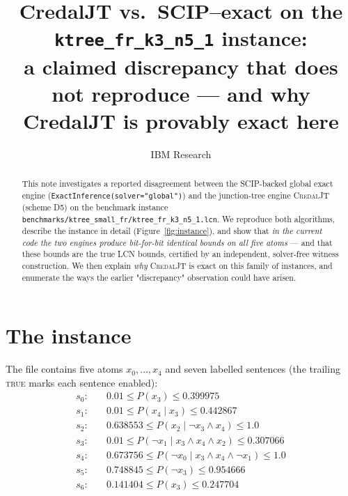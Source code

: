 \documentclass[11pt]{article}
\title{CredalJT vs.\ SCIP--exact on the \texttt{ktree\_fr\_k3\_n5\_1} instance:\\
\large a claimed discrepancy that does not reproduce --- and why CredalJT is
provably exact here}
\author{IBM Research}
\date{}
\newcommand{\ltrue}{\textsc{true}}
\begin{document}
\maketitle

\begin{abstract}
This note investigates a reported disagreement between the SCIP-backed global
exact engine (\texttt{ExactInference(solver="global")}) and the junction-tree
engine \textsc{CredalJT} (scheme D5) on the benchmark instance
\texttt{benchmarks/ktree\_small\_fr/ktree\_fr\_k3\_n5\_1.lcn}. We reproduce
both algorithms, describe the instance in detail (Figure~\ref{fig:instance}),
and show that \emph{in the current code the two engines produce bit-for-bit
identical bounds on all five atoms} --- and that these bounds are the true LCN
bounds, certified by an independent, solver-free witness construction. We then
explain \emph{why} \textsc{CredalJT} is exact on this family of instances, and
enumerate the ways the earlier "discrepancy" observation could have arisen.
\end{abstract}

\section{The instance}
\label{sec:instance}

The file contains five atoms $x_0,\dots,x_4$ and seven labelled sentences
(the trailing \ltrue{} marks each sentence enabled):
\begin{align*}
s_0:&\quad 0.01 \le P(x_3) \le 0.399975\\
s_1:&\quad 0.01 \le P(x_4 \mid x_3) \le 0.442867\\
s_2:&\quad 0.638553 \le P(x_2 \mid \lnot x_3 \land x_4) \le 1.0\\
s_3:&\quad 0.01 \le P(\lnot x_1 \mid x_3 \land x_4 \land x_2) \le 0.307066\\
s_4:&\quad 0.673756 \le P(\lnot x_0 \mid x_3 \land x_4 \land \lnot x_1) \le 1.0\\
s_5:&\quad 0.748845 \le P(\lnot x_3) \le 0.954666\\
s_6:&\quad 0.141404 \le P(x_3) \le 0.247704
\end{align*}
\end{document}
